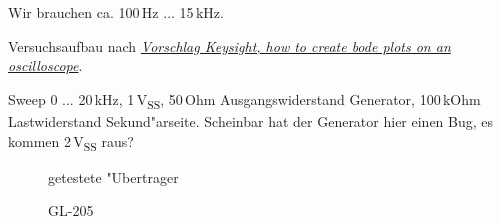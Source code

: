 \documentclass[ngerman,11pt,parskip=half] {scrartcl}
\newcommand {\tscopesize}{12cm}
\begin{document}
Wir brauchen ca. 100\,Hz ... 15\,kHz.

Versuchsaufbau nach \emph{\href{https://keysightoscilloscopes.wordpress.com/2016/04/13/how-to-create-bode-plots-on-an-oscilloscope/}{Vorschlag Keysight, how to create bode plots on an oscilloscope}}.

Sweep 0 ... 20\,kHz, 1\,V\textsubscript{SS}, 50\,Ohm Ausgangswiderstand Generator, 100\,kOhm Lastwiderstand Sekund"arseite. Scheinbar hat der Generator hier einen Bug, es kommen 2\,V\textsubscript{SS} raus?

\begin{figure}[H]
\centering
{}
\caption{getestete "Ubertrager} \label{fig:1}
\end{figure}

\begin{figure}[H]
\centering
{}
\caption{GL-205} \label{fig:1}
\end{figure}
\end{document}

